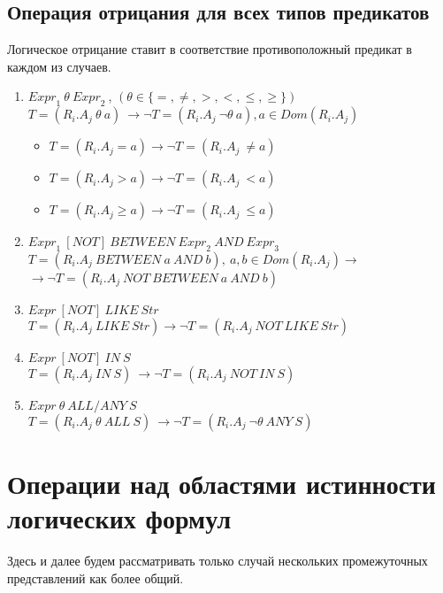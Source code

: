 \documentclass{cmi}
\def \n #1{\mathit{#1}}
\begin{document}
\subsection{Операция отрицания для всех типов предикатов}
Логическое отрицание ставит в соответствие противоположный предикат в каждом из случаев.
\begin{enumerate}
	\item $ \n{Expr}_1\ \theta\ \n{Expr}_2\ $, $(\theta \in \{=, \neq, >, <, \leq, \geq\})$\\
	$T = (\n{R_i.A_j}\ \theta\ a)\ \rightarrow \neg T = (\n{R_i.A_j}\ \neg \theta\ a),
	a \in Dom(R_i.A_j)$
	\begin{itemize}
		\item $T = (\n{R_i.A_j} = a) \rightarrow \neg T =  (\n{R_i.A_j}\ \neq a)$
		\item $T = (\n{R_i.A_j} > a) \rightarrow \neg T =  (\n{R_i.A_j}\ < a)$
		\item $T = (\n{R_i.A_j} \geq a) \rightarrow \neg T = (\n{R_i.A_j}\ \leq
		a)$
	\end{itemize}
	\item $\n{Expr}_1\ \n{[NOT]}\ \n{BETWEEN}\ \n{Expr}_2\ \n{AND}\ \n{Expr}_3$\\
	$T = (\n{R_i.A_j}\ \n{BETWEEN}\ a\ \n{AND}\ b),\ a, b \in Dom(R_i.A_j) \rightarrow$\\
	$\rightarrow \neg T = (\n{R_i.A_j}\ \n{NOT}\ \n{BETWEEN}\ a\ \n{AND}\ b)$
	\item $\n{Expr}\ \n{[NOT]}\ \n{LIKE}\ \n{Str}$\\
	$T = (\n{R_i.A_j}\ \n{LIKE}\ \n{Str}) \rightarrow \neg T = (\n{R_i.A_j}\ \n{NOT}\ \n{LIKE}\
	\n{Str})$
	\item $\n{Expr}\ \n{[NOT]}\ \n{IN}\ S$\\
	$T = (\n{R_i.A_j}\ \n{IN}\ S)\ \rightarrow \neg T = (\n{R_i.A_j}\ \n{NOT}\ \n{IN}\ S)$
	\item $\n{Expr}\ \theta\ \n{ALL/ANY}\ S$\\
	$T = (\n{R_i.A_j}\ \theta\ \n{ALL}\ S)\ \rightarrow \neg T = (\n{R_i.A_j}\ \neg \theta\ \n{ANY}\ S
	)$
\end{enumerate}


\section{Операции над областями истинности логических формул}
\label{sec-comparison}
Здесь и далее будем рассматривать только случай нескольких промежуточных
представлений как более общий.
\end{document}
